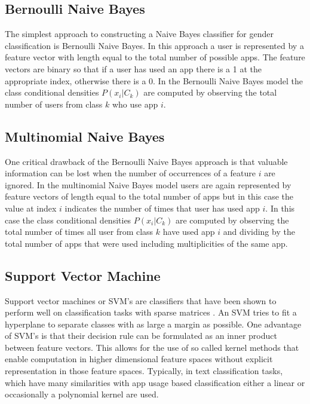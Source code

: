 \documentclass[10pt,twocolumn,letterpaper]{article}
\begin{document}
\subsection{Bernoulli Naive Bayes}

The simplest approach to constructing a Naive Bayes classifier for gender classification is Bernoulli Naive Bayes. In this approach a user is represented by a feature vector with length equal to the total number of possible apps.  The feature vectors are binary so that if a user has used an app there is a 1 at the appropriate index, otherwise there is a 0.  In the Bernoulli Naive Bayes model the class conditional densities $P(x_i|C_k)$ are computed by observing the total number of users from class $k$ who use app $i$.

\subsection{Multinomial Naive Bayes}

One critical drawback of the Bernoulli Naive Bayes approach is that valuable information can be lost when the number of occurrences of a feature $i$ are ignored.  In the multinomial Naive Bayes model users are again represented by feature vectors of length equal to the total number of apps but in this case the value at index $i$ indicates the number of times that user has used app $i$.  In this case the class conditional densities $P(x_i|C_k)$ are computed by observing the total number of times all user from class $k$ have used app $i$ and dividing by the total number of apps that were used including multiplicities of the same app.  

\subsection{Support Vector Machine}

Support vector machines or SVM's are classifiers that have been shown to perform well on classification tasks with sparse matrices \cite{Joachims:1998:TCS:645326.649721}.  An SVM tries to fit a hyperplane to separate classes with as large a margin as possible.  One advantage of SVM's is that their decision rule can be formulated as an inner product between feature vectors.  This allows for the use of so called kernel methods that enable computation in higher dimensional feature spaces without explicit representation in those feature spaces.  Typically, in text classification tasks, which have many similarities with app usage based classification either a linear or occasionally a polynomial kernel are used.
\end{document}
